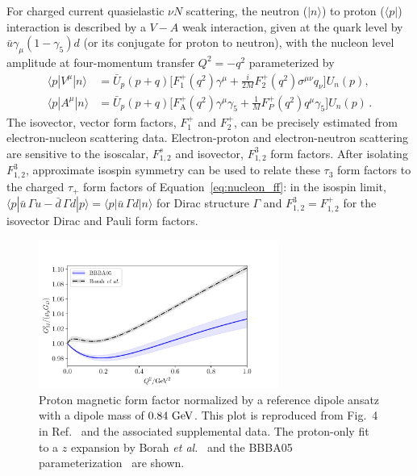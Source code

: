 \documentclass{ar-1col}
\def\new#1{{\color{blue}#1}}
\begin{document}
For charged current quasielastic $\nu N$ scattering,
the neutron ($|n\rangle$) to proton ($\langle p|$)
interaction is described by a $V-A$ weak interaction, given at the quark level by
$\bar{u}\gamma_\mu(1- \gamma_5)d$ (or its conjugate for proton to neutron), with the nucleon level amplitude at four-momentum transfer $Q^2 = -q^2$ parameterized by
\begin{align}\label{eq:nucleon_ff}
\langle p | V^\mu | n \rangle
    &= \bar{U}_p(p+q) \Big[
        F_1^+(q^2) \gamma^\mu
        +\frac{i}{2M} F_2^+(q^2) \sigma^{\mu\nu} q_\nu
    \Big] U_n(p),
\nonumber\\
\langle p | A^\mu | n \rangle
    &= \bar{U}_p(p+q) \Big[
        F_{\mathrm{A}}^+(q^2) \gamma^\mu \gamma_5
        +\frac{1}{M} F_P^+(q^2) q^\mu \gamma_5
    \Big] U_n(p)\, .
\end{align}
The isovector, vector form factors, $F_1^+$ and $F_2^+$, can be precisely estimated from electron-nucleon scattering data.
Electron-proton and electron-neutron scattering are sensitive to the isoscalar, $F_{1,2}^s$ and isovector, $F_{1,2}^3$ form factors.  After isolating $F_{1,2}^3$, approximate isospin symmetry can be used to relate these $\tau_3$ form factors to the charged $\tau_+$ form factors of Equation~\eqref{eq:nucleon_ff}: in the isospin limit, $\langle p| \bar{u}\, \Gamma u - \bar{d}\, \Gamma d |p\rangle = \langle p| \bar{u}\, \Gamma d |n\rangle$
 for Dirac structure $\Gamma$ \new{and $F_{1,2}^3 = F_{1,2}^+$
 for the isovector Dirac and Pauli form factors}.
\begin{figure}
 \centering
 \includegraphics[width=0.7\textwidth]{plots/proton_magnetic-standalone.pdf}
 \vspace{4pt}
\caption{
Proton magnetic form factor normalized by a reference dipole ansatz
with a dipole mass of $0.84~{\rm GeV}$.
This plot is reproduced from Fig.~4 in Ref.~\cite{Borah:2020gte}
 and the associated supplemental data.
The proton-only fit to a $z$ expansion by Borah {\it et al.}~\cite{Borah:2020gte}
and the BBBA05 parameterization~\cite{Bradford:2006yz} are shown.
\label{fig:protonmagneticff}
}
\end{figure}
\end{document}
